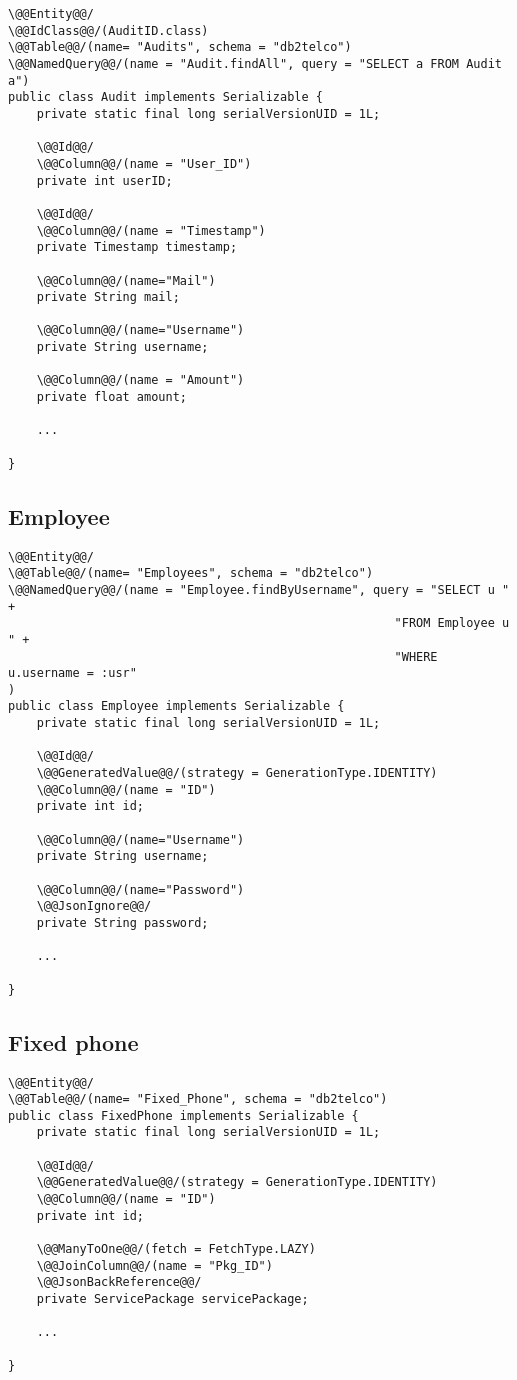 \begin{lstlisting}[style = JPA]
\@@Entity@@/
\@@IdClass@@/(AuditID.class)
\@@Table@@/(name= "Audits", schema = "db2telco")
\@@NamedQuery@@/(name = "Audit.findAll", query = "SELECT a FROM Audit a")
public class Audit implements Serializable {
    private static final long serialVersionUID = 1L;

    \@@Id@@/
    \@@Column@@/(name = "User_ID")
    private int userID;

    \@@Id@@/
    \@@Column@@/(name = "Timestamp")
    private Timestamp timestamp;

    \@@Column@@/(name="Mail")
    private String mail;

    \@@Column@@/(name="Username")
    private String username;

    \@@Column@@/(name = "Amount")
    private float amount;

    ...

}
\end{lstlisting}

\subsection*{Employee}

\begin{lstlisting}[style = JPA]
\@@Entity@@/
\@@Table@@/(name= "Employees", schema = "db2telco")
\@@NamedQuery@@/(name = "Employee.findByUsername", query = "SELECT u " + 
                                                      "FROM Employee u " + 
                                                      "WHERE u.username = :usr"
)
public class Employee implements Serializable {
    private static final long serialVersionUID = 1L;

    \@@Id@@/
    \@@GeneratedValue@@/(strategy = GenerationType.IDENTITY)
    \@@Column@@/(name = "ID")
    private int id;

    \@@Column@@/(name="Username")
    private String username;

    \@@Column@@/(name="Password")
    \@@JsonIgnore@@/
    private String password;

    ...

}
\end{lstlisting}

\subsection*{Fixed phone}

\begin{lstlisting}[style = JPA]
\@@Entity@@/
\@@Table@@/(name= "Fixed_Phone", schema = "db2telco")
public class FixedPhone implements Serializable {
    private static final long serialVersionUID = 1L;

    \@@Id@@/
    \@@GeneratedValue@@/(strategy = GenerationType.IDENTITY)
    \@@Column@@/(name = "ID")
    private int id;

    \@@ManyToOne@@/(fetch = FetchType.LAZY)
    \@@JoinColumn@@/(name = "Pkg_ID")
    \@@JsonBackReference@@/
    private ServicePackage servicePackage;

    ...

}
\end{lstlisting}

